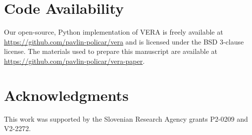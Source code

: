 \documentclass[lettersize,journal]{IEEEtran}
\begin{document}
\section*{Code Availability}

Our open-source, Python implementation of VERA is freely available at \url{https://github.com/pavlin-policar/vera} and is licensed under the BSD 3-clause license. The materials used to prepare this manuscript are available at \url{https://github.com/pavlin-policar/vera-paper}.


\section*{Acknowledgments}
This work was supported by the Slovenian Research Agency grants P2-0209 and V2-2272.
 
%




 




\end{document}
